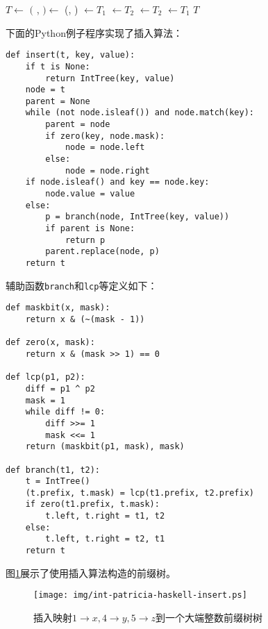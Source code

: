 \documentclass[UTF8]{article}
\begin{document}
\begin{algorithmic}[1]
  \State $T \gets$ 
  \State $($ ,  $) \gets$ (, )
    \State {} $\gets T_1$
    \State {} $\gets T_2$
  \Else
    \State {} $\gets T_2$
    \State {} $\gets T_1$
  \EndIf
  \State \Return $T$
\EndFunction
\end{algorithmic}

下面的Python例子程序实现了插入算法：

\lstset{language=Python}
\begin{lstlisting}
def insert(t, key, value):
    if t is None:
        return IntTree(key, value)
    node = t
    parent = None
    while (not node.isleaf()) and node.match(key):
        parent = node
        if zero(key, node.mask):
            node = node.left
        else:
            node = node.right
    if node.isleaf() and key == node.key:
        node.value = value
    else:
        p = branch(node, IntTree(key, value))
        if parent is None:
            return p
        parent.replace(node, p)
    return t
\end{lstlisting}

辅助函数\texttt{branch}和\texttt{lcp}等定义如下：

\begin{lstlisting}
def maskbit(x, mask):
    return x & (~(mask - 1))

def zero(x, mask):
    return x & (mask >> 1) == 0

def lcp(p1, p2):
    diff = p1 ^ p2
    mask = 1
    while diff != 0:
        diff >>= 1
        mask <<= 1
    return (maskbit(p1, mask), mask)

def branch(t1, t2):
    t = IntTree()
    (t.prefix, t.mask) = lcp(t1.prefix, t2.prefix)
    if zero(t1.prefix, t.mask):
        t.left, t.right = t1, t2
    else:
        t.left, t.right = t2, t1
    return t
\end{lstlisting}

图\ref{fig:int-patricia-haskell-insert}展示了使用插入算法构造的前缀树。

\begin{figure}[htbp]
  \centering
  \texttt{[image: img/int-patricia-haskell-insert.ps]}
  \caption{插入映射$1 \rightarrow x, 4 \rightarrow y, 5 \rightarrow z$到一个大端整数前缀树树}
  \label{fig:int-patricia-haskell-insert}
\end{figure}
\end{document}
